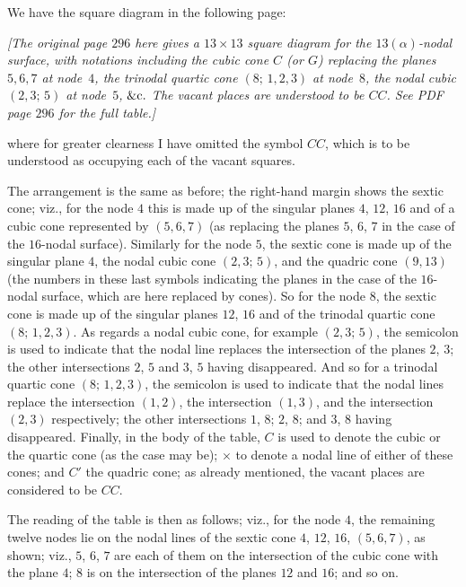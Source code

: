 \documentclass[11pt,a4paper]{article}
\begin{document}
We have the square diagram in the following page:

\bigskip

\begin{center}
\textit{[The original page $296$ here gives a $13 \times 13$ square
diagram for the $13(\alpha)$-nodal surface, with notations including the
cubic cone $C$ (or $G$) replacing the planes $5, 6, 7$ at node~$4$, the
trinodal quartic cone $(8;\,1,2,3)$ at node~$8$, the nodal cubic
$(2, 3;\,5)$ at node~$5$, $\&{\rm c}.$ The vacant places are understood
to be $C C$. See PDF page $296$ for the full table.]}
\end{center}

\bigskip

\noindent where for greater clearness I have omitted the symbol $CC$,
which is to be understood as occupying each of the vacant squares.

The arrangement is the same as before; the right-hand margin shows the
sextic cone; viz., for the node $4$ this is made up of the singular planes
$4$, $12$, $16$ and of a cubic cone represented by $(5, 6, 7)$ (as
replacing the planes $5$, $6$, $7$ in the case of the $16$-nodal surface).
Similarly for the node $5$, the sextic cone is made up of the singular
plane $4$, the nodal cubic cone $(2, 3;\,5)$, and the quadric cone $(9, 13)$
(the numbers in these last symbols indicating the planes in the case of
the $16$-nodal surface, which are here replaced by cones). So for the
node $8$, the sextic cone is made up of the singular planes $12$, $16$
and of the trinodal quartic cone $(8;\,1, 2, 3)$. As regards a nodal
cubic cone, for example $(2, 3;\,5)$, the semicolon is used to indicate
that the nodal line replaces the intersection of the planes $2$, $3$; the
other intersections $2$, $5$ and $3$, $5$ having disappeared. And so for
a trinodal quartic cone $(8;\,1, 2, 3)$, the semicolon is used to
indicate that the nodal lines replace the intersection $(1, 2)$, the
intersection $(1, 3)$, and the intersection $(2, 3)$ respectively; the
other intersections $1$, $8$; $2$, $8$; and $3$, $8$ having disappeared.
Finally, in the body of the table, $C$ is used to denote the cubic or the
quartic cone (as the case may be); $\times$ to denote a nodal line of
either of these cones; and $C'$ the quadric cone; as already mentioned,
the vacant places are considered to be $C C$.

The reading of the table is then as follows; viz., for the node $4$, the
remaining twelve nodes lie on the nodal lines of the sextic cone $4$,
$12$, $16$, $(5, 6, 7)$, as shown; viz., $5$, $6$, $7$ are each of them
on the intersection of the cubic cone with the plane $4$; $8$ is on the
intersection of the planes $12$ and $16$; and so on.
\end{document}
